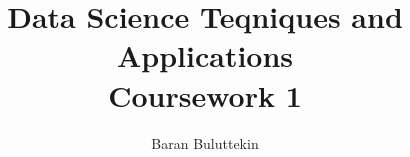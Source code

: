 \documentclass{article}
\begin{document}
    \title{Data Science Teqniques and Applications\\Coursework 1}
    \author{Baran Buluttekin}
    \maketitle
\end{document}
